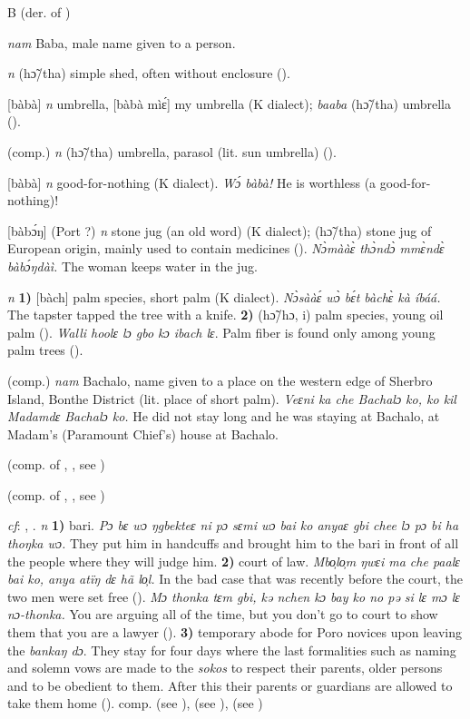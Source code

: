 \begin{letter}{B}
 (der. of ) 

 \textit{nam} Baba, male name given to a person.

 \textit{n} (hɔ̃/tha) simple shed, often without enclosure (\citealt{Pichl1967}). 

 [bàbà] \textit{n} umbrella, [bàbà mìɛ́] my umbrella (K dialect); \textit{baaba} (hɔ̃/tha) umbrella (\citealt{Pichl1967}). 

 (comp.) \textit{n} (hɔ̃/tha) umbrella, parasol (lit. sun umbrella) (\citealt{Pichl1967}).

 [bàbà] \textit{n} good-for-nothing (K dialect). \textit{Wɔ́ bàbà!} He is worthless (a good-for-nothing)!

 [bàbɔ́ŋ] (Port ?) \textit{n} stone jug (an old word) (K dialect); (hɔ̃/tha) stone jug of European origin, mainly used to contain medicines (\citealt{Pichl1967}). \textit{Nɔ̀mààɛ̀ thɔ̀ndɔ̀ mmɛ̀ndɛ̀ bàbɔ́ŋdàì.} The woman keeps water in the jug. 

 \textit{n} \textbf{1)} [bàch] palm species, short palm (K dialect). \textit{Nɔ̀sààɛ́ wɔ̀ bɛ́t bàchɛ̀ kà íbáá.} The tapster tapped the tree with a knife. \textbf{2)} (hɔ̃/hɔ, i) palm species, young oil palm (\citealt{Pichl1967}). \textit{Walli hoolɛ lɔ gbo kɔ ibach lɛ}. Palm fiber is found only among young palm trees (\citealt{Pichl1967}).

 (comp.) \textit{nam} Bachalo, name given to a place on the western edge of Sherbro Island, Bonthe District (lit. place of short palm). \textit{Veɛni ka che Bachalɔ ko, ko kil Madamdɛ Bachalɔ ko.} He did not stay long and he was staying at Bachalo, at Madam's (Paramount Chief's) house at Bachalo.

 (comp. of , , see ) 

 (comp. of , , see )

 \textit{cf}: , . \textit{n} \textbf{1)} bari. \textit{Pɔ bɛ wɔ ŋgbekteɛ ni pɔ sɛmi wɔ bai ko anyaɛ gbi chee lɔ pɔ bi ha thoŋka wɔ.} They put him in handcuffs and brought him to the bari in front of all the people where they will judge him. \textbf{2)} court of law. \textit{Mbo̹lo̹m ŋwɛi ma che paalɛ bai ko, anya atïŋ dɛ hã lo̹l.} In the bad case that was recently before the court, the two men were set free (\citealt{Pichl1967}). \textit{Mɔ thonka tɛm gbi, kə nchen kɔ bay ko no pə si lɛ mɔ lɛ nɔ-thonka.} You are arguing all of the time, but you don't go to court to show them that you are a lawyer (\citealt{Pichl1967}). \textbf{3)} temporary abode for Poro novices upon leaving the \textit{bankaŋ dɔ}. They stay for four days where the last formalities such as naming and solemn vows are made to the \textit{sokos} to respect their parents, older persons and to be obedient to them. After this their parents or guardians are allowed to take them home (\citealt{Pichl1967}). comp.  (see ),  (see ),  (see ) 


\end{letter}
